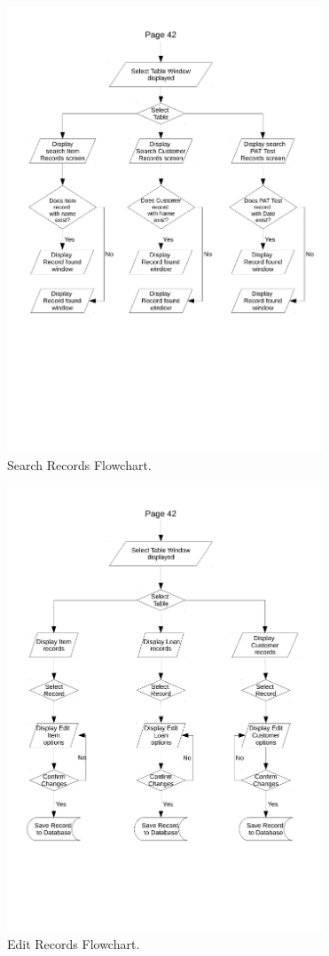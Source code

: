 \begin{figure}[H]
    \begin{center}
        \includegraphics[width=355px]{./Design/system_flowcharts/PDFs/search_records_flowchart.pdf}
    \end{center}
    \caption{Search Records Flowchart.} \label{fig:print_function_result}
\end{figure}

\begin{figure}[H]
    \begin{center}
        \includegraphics[width=355px]{./Design/system_flowcharts/PDFs/edit_records_flowchart.pdf}
    \end{center}
    \caption{Edit Records Flowchart.} \label{fig:print_function_result}
\end{figure}

